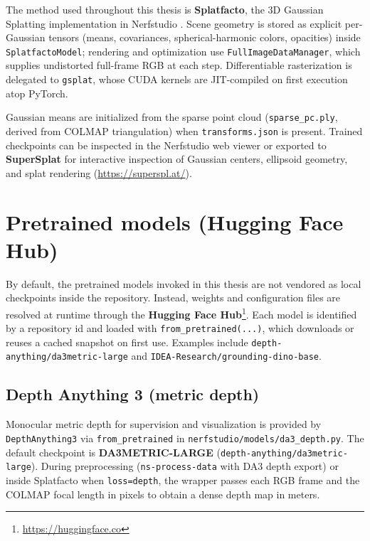 \documentclass{report}
\newcommand{\filepath}[1]{\nolinkurl{#1}}
\newcommand{\codeid}[1]{\nolinkurl{#1}}
\newcommand{\code}[1]{\nolinkurl{#1}}
\begin{document}
The method used throughout this thesis is \textbf{Splatfacto}, the 3D Gaussian Splatting implementation in Nerfstudio \cite{kerbl2023gaussian}. Scene geometry is stored as explicit per-Gaussian tensors (means, covariances, spherical-harmonic colors, opacities) inside \code{SplatfactoModel}; rendering and optimization use \code{FullImageDataManager}, which supplies undistorted full-frame RGB at each step. Differentiable rasterization is delegated to \code{gsplat}, whose CUDA kernels are JIT-compiled on first execution atop PyTorch.

Gaussian means are initialized from the sparse point cloud (\filepath{sparse\_pc.ply}, derived from COLMAP triangulation) when \filepath{transforms.json} is present. Trained checkpoints can be inspected in the Nerfstudio web viewer or exported to \textbf{SuperSplat} \cite{supersplat2024} for interactive inspection of Gaussian centers, ellipsoid geometry, and splat rendering (\url{https://superspl.at/}).

\section{Pretrained models (Hugging Face Hub)}
\label{sec:huggingface}

By default, the pretrained models invoked in this thesis are not vendored as local checkpoints inside the repository. Instead, weights and configuration files are resolved at runtime through the \textbf{Hugging Face Hub}\footnote{\url{https://huggingface.co}}. Each model is identified by a repository id and loaded with \texttt{from\_pretrained(...)}, which downloads or reuses a cached snapshot on first use. Examples include \codeid{depth-anything/da3metric-large} and \codeid{IDEA-Research/grounding-dino-base}.

\subsection{Depth Anything 3 (metric depth)}
Monocular metric depth for supervision and visualization is provided by \texttt{Depth\-Anything3} via \texttt{from\_pretrained} in \filepath{nerfstudio/models/da3\_depth.py}. The default checkpoint is \textbf{DA3METRIC-LARGE} (\codeid{depth-anything/da3metric-large}). During preprocessing (\texttt{ns-process-data} with DA3 depth export) or inside Splatfacto when \texttt{loss=depth}, the wrapper passes each RGB frame and the COLMAP focal length in pixels to obtain a dense depth map in meters.
\end{document}
